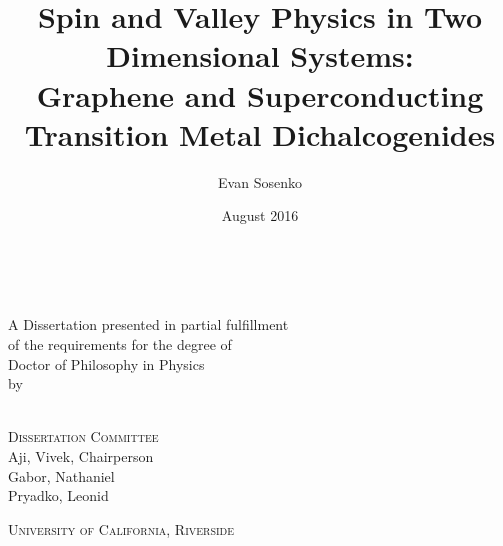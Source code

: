 \title{Spin and Valley Physics in Two Dimensional Systems: \\%
  Graphene and Superconducting Transition Metal Dichalcogenides}
\author{Evan Sosenko}
\date{August 2016}

\newcommand{\thedegree}{Doctor of Philosophy}
\newcommand{\thefield}{Physics}
\newcommand{\theuniversity}{University of California, Riverside}
\newcommand{\thechair}{Aji, Vivek}
\newcommand{\thecommittee}{%
  Gabor, Nathaniel \\
  Pryadko, Leonid
}

\clearpage
\thispagestyle{empty}
\centering
\vspace*{-\toptafiddle}

\textsc{\thetitle} \\

\vfill

A Dissertation presented in partial fulfillment \\
of the requirements for the degree of \\
\thedegree{} in \thefield{} \\
by \\
\theauthor{} \\
\thedate{}

\vfill

\textsc{Dissertation Committee} \\
\thechair{}, Chairperson \\
\thecommittee{}

\vfill

\textsc{\theuniversity}

\enlargethispage{\bottafiddle}
\clearpage
